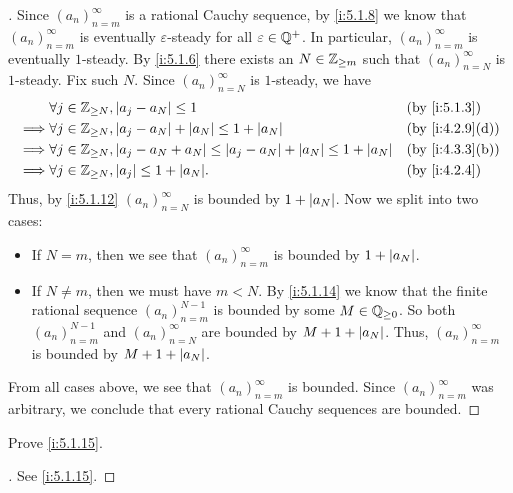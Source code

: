 \begin{proof}[]
  Since \((a_n)_{n = m}^{\infty}\) is a rational Cauchy sequence, by \cref{i:5.1.8} we know that \((a_n)_{n = m}^{\infty}\) is eventually \(\varepsilon\)-steady for all \(\varepsilon \in \mathbb{Q}^+\).
  In particular, \((a_n)_{n = m}^{\infty}\) is eventually \(1\)-steady.
  By \cref{i:5.1.6} there exists an \(N \in \mathbb{Z}_{\geq m}\) such that \((a_n)_{n = N}^{\infty}\) is \(1\)-steady.
  Fix such \(N\).
  Since \((a_n)_{n = N}^\infty\) is \(1\)-steady, we have
  \begin{align*}
             & \forall j \in \Z_{\geq N}, \abs{a_j - a_N} \leq 1                                                    &  & \by{i:5.1.3}    \\
    \implies & \forall j \in \Z_{\geq N}, \abs{a_j - a_N} + \abs{a_N} \leq 1 + \abs{a_N}                            &  & \by{i:4.2.9}[d] \\
    \implies & \forall j \in \Z_{\geq N}, \abs{a_j - a_N + a_N} \leq \abs{a_j - a_N} + \abs{a_N} \leq 1 + \abs{a_N} &  & \by{i:4.3.3}[b] \\
    \implies & \forall j \in \Z_{\geq N}, \abs{a_j} \leq 1 + \abs{a_N}.                                             &  & \by{i:4.2.4}
  \end{align*}
  Thus, by \cref{i:5.1.12} \((a_n)_{n = N}^\infty\) is bounded by \(1 + \left\lvert a_N\right\rvert\).
  Now we split into two cases:
  \begin{itemize}
    \item If \(N = m\), then we see that \((a_n)_{n = m}^\infty\) is bounded by \(1 + \left\lvert a_N\right\rvert\).
    \item If \(N \neq m\), then we must have \(m < N\).
          By \cref{i:5.1.14} we know that the finite rational sequence \((a_n)_{n = m}^{N - 1}\) is bounded by some \(M \in \mathbb{Q}_{\geq 0}\).
          So both \((a_n)_{n = m}^{N - 1}\) and \((a_n)_{n = N}^\infty\) are bounded by \(M + 1 + \left\lvert a_N\right\rvert\).
          Thus, \((a_n)_{n = m}^\infty\) is bounded by \(M + 1 + \left\lvert a_N\right\rvert\).
  \end{itemize}
  From all cases above, we see that \((a_n)_{n = m}^\infty\) is bounded.
  Since \((a_n)_{n = m}^\infty\) was arbitrary, we conclude that every rational Cauchy sequences are bounded.
\end{proof}

\exercisesection

\begin{ex}\label{i:ex:5.1.1}
  Prove \cref{i:5.1.15}.
\end{ex}

\begin{proof}[]
  See \cref{i:5.1.15}.
\end{proof}
